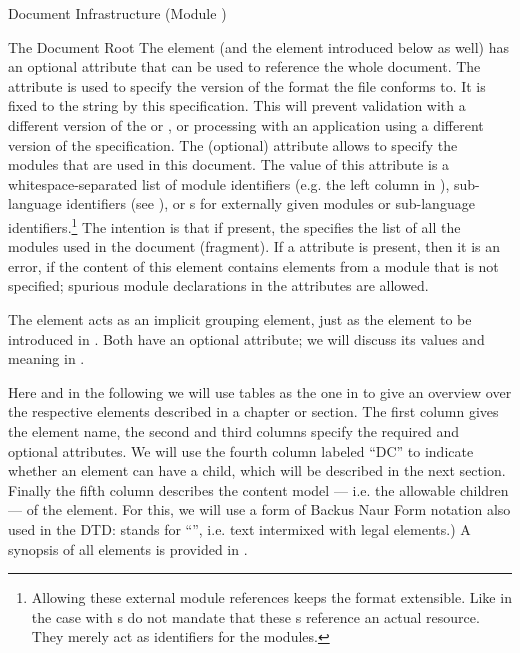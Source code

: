\begin{tchapter}[id=omdoc-infrastructure,short=Document Infrastructure]{Document Infrastructure (Module )}
{\begin{tsection}[id=root]{The Document Root}
  The  element (and the  element introduced below as
  well) has an optional attribute  that can be used to
  reference the whole document. The  attribute is used to
  specify the version of the \omdoc format the file conforms to.  It is fixed to the
  string  by this specification.  This will prevent validation with a
  different version of the  or , or processing with an
  application using a different version of the \omdoc specification. The (optional)
  attribute  allows to specify the \omdoc modules that are
  used in this document. The value of this attribute is a whitespace-separated list of
  module identifiers (e.g.  the left column in
  ), \omdoc sub-language identifiers (see
  ), or {s} for externally given
  \omdoc modules or sub-language identifiers.\footnote{Allowing these external module
    references keeps the \omdoc format extensible. Like in the case with
    {s} \omdoc do not mandate that these
    {s} reference an actual resource. They merely act as
    identifiers for the modules.} The intention is that if present, the
   specifies the list of all the modules used in the document
  (fragment).  If a  attribute is present, then it is an error,
  if the content of this element contains elements from a module that is not specified;
  spurious module declarations in the  attributes are allowed.
  
  The  element acts as an implicit grouping element, just as the
   element to be introduced in . Both have an
  optional  attribute; we will discuss its values and meaning in
  .
  
  Here and in the following we will use tables as the one in  to
  give an overview over the respective \omdoc elements described in a chapter or
  section.  The first column gives the element name, the second and third columns specify
  the required and optional attributes. We will use the fourth column labeled ``DC'' to
  indicate whether an \omdoc element can have a {} child, which will
  be described in the next section.  Finally the fifth column describes the content model
  --- i.e. the allowable children --- of the element. For this, we will use a form of
  Backus Naur Form notation also used in the DTD:
   stands for ``'', i.e. text
  intermixed with legal \omdoc elements.) A synopsis of all elements is provided in
  .


\end{tsection}}
\end{tchapter}
